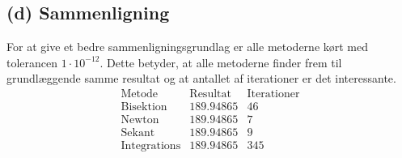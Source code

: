 \subsection*{(d) Sammenligning}
% 
For at give et bedre sammenligningsgrundlag er alle metoderne kørt med tolerancen $1\cdot10^{-12}$.
Dette betyder, at alle metoderne finder frem til grundlæggende samme resultat og at antallet af iterationer er det interessante.
%
$$\begin{array}{l|c|c}
\text{Metode} & \text{Resultat} & \text{Iterationer}\\
\hline
\text{Bisektion}	& 189.94865 & 46\\
\text{Newton}		& 189.94865 & 7\\
\text{Sekant}		& 189.94865 & 9\\
\text{Integrations}	& 189.94865 & 345
\end{array}$$